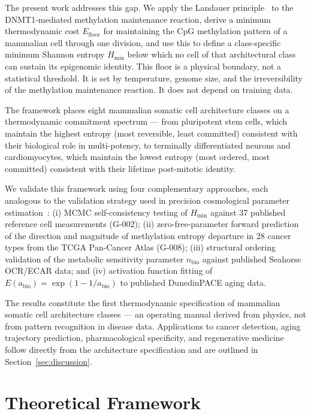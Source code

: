 \documentclass[12pt,a4paper]{article}
\newcommand{\Hmin}{H_{\min}}
\newcommand{\nbio}{n_{\mathrm{bio}}}
\newcommand{\Efloor}{E_{\mathrm{floor}}}
\newcommand{\Eabio}{E(a_{\mathrm{bio}})}
\begin{document}
The present work addresses this gap. We apply the Landauer
principle~\cite{Landauer1961,Bennett1982} to the DNMT1-mediated methylation
maintenance reaction, derive a minimum thermodynamic cost $\Efloor$ for
maintaining the CpG methylation pattern of a mammalian cell through one
division, and use this to define a class-specific minimum Shannon entropy
$\Hmin$ below which no cell of that architectural class can sustain its
epigenomic identity. This floor is a physical boundary, not a statistical
threshold. It is set by temperature, genome size, and the irreversibility
of the methylation maintenance reaction. It does not depend on training data.

The framework places eight mammalian somatic cell architecture classes on a
thermodynamic commitment spectrum --- from pluripotent stem cells, which
maintain the highest entropy (most reversible, least committed) consistent with
their biological role in multi-potency, to terminally differentiated neurons
and cardiomyocytes, which maintain the lowest entropy (most ordered,
most committed) consistent with their lifetime post-mitotic identity.

We validate this framework using four complementary approaches, each analogous
to the validation strategy used in precision cosmological parameter
estimation~\cite{Planck2018}: (i) MCMC self-consistency testing of $\Hmin$
against 37 published reference cell measurements (G-002); (ii) zero-free-parameter
forward prediction of the direction and magnitude of methylation entropy departure
in 28 cancer types from the TCGA Pan-Cancer Atlas (G-008); (iii) structural
ordering validation of the metabolic sensitivity parameter $\nbio$ against
published Seahorse OCR/ECAR data; and (iv) activation function fitting of
$\Eabio = \exp(1 - 1/a_{\mathrm{bio}})$ to published DunedinPACE aging data.

The results constitute the first thermodynamic specification of mammalian somatic
cell architecture classes --- an operating manual derived from physics, not from
pattern recognition in disease data. Applications to cancer detection, aging
trajectory prediction, pharmacological specificity, and regenerative medicine
follow directly from the architecture specification and are outlined in
Section~\ref{sec:discussion}.

\section{Theoretical Framework}
\label{sec:theory}
\end{document}
